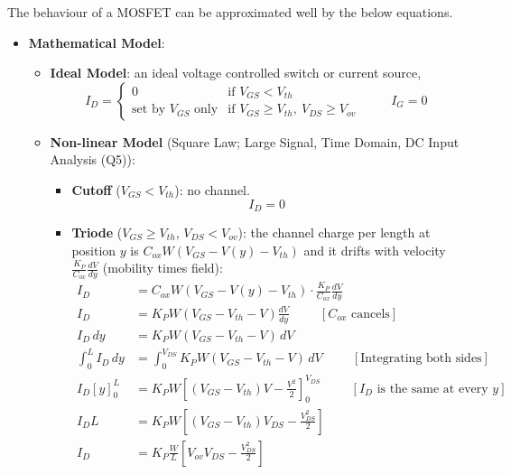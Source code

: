 The behaviour of a MOSFET can be approximated well by the below equations.
\begin{itemize}
  \item \textbf{Mathematical Model}:
    \begin{itemize}
      \item \textbf{Ideal Model}: an ideal voltage controlled switch or current source,
        \[
          I_D = \begin{cases}
            0 & \text{if } V_{GS} < V_{th} \\
            \text{set by } V_{GS} \text{ only} & \text{if } V_{GS} \geq V_{th},\ V_{DS} \geq V_{ov}
          \end{cases}
          \hspace{1cm} I_G = 0
        \]
      \item \textbf{Non-linear Model} (Square Law; Large Signal, Time Domain, DC Input Analysis (Q5)):
        \begin{itemize}
          \item \textbf{Cutoff} (\(V_{GS} < V_{th}\)): no channel.
            \[
              I_D = 0
            \]
          \item \textbf{Triode} (\(V_{GS} \geq V_{th}\), \(V_{DS} < V_{ov}\)): the
            channel charge per length at position \(y\) is
            \(C_{ox} W (V_{GS} - V(y) - V_{th})\) and it drifts with velocity
            \(\frac{K_P}{C_{ox}} \frac{dV}{dy}\) (mobility times field):
            \begin{align*}
              I_D &= C_{ox} W (V_{GS} - V(y) - V_{th}) \cdot \frac{K_P}{C_{ox}} \frac{dV}{dy} \\
              I_D &= K_P W (V_{GS} - V_{th} - V) \frac{dV}{dy} \hspace{1cm} [C_{ox} \text{ cancels}] \\
              I_D \, dy &= K_P W (V_{GS} - V_{th} - V) \, dV \\
              \int_0^L I_D \, dy &= \int_0^{V_{DS}} K_P W (V_{GS} - V_{th} - V) \, dV \hspace{1cm} [\text{Integrating both sides}] \\
              I_D \left[ y \right]_0^L &= K_P W \left[ (V_{GS} - V_{th}) V - \frac{V^2}{2} \right]_0^{V_{DS}} \hspace{1cm} [I_D \text{ is the same at every } y] \\
              I_D L &= K_P W \left[ (V_{GS} - V_{th}) V_{DS} - \frac{V_{DS}^2}{2} \right] \\
              I_D &= K_P \frac{W}{L} \left[ V_{ov} V_{DS} - \frac{V_{DS}^2}{2} \right]

\end{align*}
\end{itemize}
\end{itemize}
\end{itemize}
